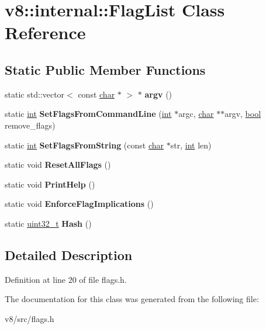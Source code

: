 \hypertarget{classv8_1_1internal_1_1FlagList}{}\section{v8\+:\+:internal\+:\+:Flag\+List Class Reference}
\label{classv8_1_1internal_1_1FlagList}
\subsection*{Static Public Member Functions}
\begin{DoxyCompactItemize}
\item 
\mbox{\label{classv8_1_1internal_1_1FlagList_abd6876eaa638bac9cd42f84c5a900d0f}} 
static std\+::vector$<$ const \mbox{\hyperlink{classchar}{char}} $\ast$ $>$ $\ast$ {\bfseries argv} ()
\item 
\mbox{\label{classv8_1_1internal_1_1FlagList_adecbc8787f8ddaa6198b467581b535fc}} 
static \mbox{\hyperlink{classint}{int}} {\bfseries Set\+Flags\+From\+Command\+Line} (\mbox{\hyperlink{classint}{int}} $\ast$argc, \mbox{\hyperlink{classchar}{char}} $\ast$$\ast$argv, \mbox{\hyperlink{classbool}{bool}} remove\+\_\+flags)
\item 
\mbox{\label{classv8_1_1internal_1_1FlagList_a2bdfe28671d75091c0b6e066ab6e1519}} 
static \mbox{\hyperlink{classint}{int}} {\bfseries Set\+Flags\+From\+String} (const \mbox{\hyperlink{classchar}{char}} $\ast$str, \mbox{\hyperlink{classint}{int}} len)
\item 
\mbox{\label{classv8_1_1internal_1_1FlagList_a152980d677afcea2ecb4ffc3dc5432bf}} 
static void {\bfseries Reset\+All\+Flags} ()
\item 
\mbox{\label{classv8_1_1internal_1_1FlagList_a1d20b7023c5d8ef19632190eb3d64566}} 
static void {\bfseries Print\+Help} ()
\item 
\mbox{\label{classv8_1_1internal_1_1FlagList_a36aa2f221cc77799bad05b4a27c79afa}} 
static void {\bfseries Enforce\+Flag\+Implications} ()
\item 
\mbox{\label{classv8_1_1internal_1_1FlagList_ae90e8bdd101ea4517d0bca54fac5569e}} 
static \mbox{\hyperlink{classuint32__t}{uint32\+\_\+t}} {\bfseries Hash} ()
\end{DoxyCompactItemize}


\subsection{Detailed Description}


Definition at line 20 of file flags.\+h.



The documentation for this class was generated from the following file\+:\begin{DoxyCompactItemize}
\item 
v8/src/flags.\+h\end{DoxyCompactItemize}
